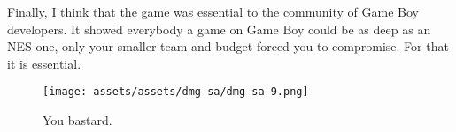 \documentclass{book}
\begin{document}
Finally, I think that the game was essential to the community of Game Boy developers. It showed everybody a game on Game Boy could be as deep as an NES one, only your smaller team and budget forced you to compromise. For that it is essential.

\begin{figure}[hbt]
\vskip 10pt
\centering \texttt{[image: assets/assets/dmg-sa/dmg-sa-9.png]}\par\pagetwodescription You bastard.
\vskip 6pt
\end{figure}




















































\endgroup 
\end{document}
